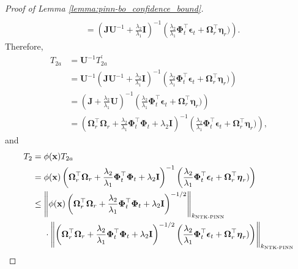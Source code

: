 \begin{proof}[Proof of Lemma \ref{lemma:pinn-bo_confidence_bound}]
\begin{align*}
\\
       & = \left(\mathbf{J}\mathbf{U}^{-1}  + \frac{\lambda_2}{\lambda_1}\mathbf{I} \right)^{-1} \left(\frac{\lambda_2}{\lambda_1}\boldsymbol{\Phi}_t^\top \boldsymbol{\epsilon}_t + \boldsymbol{\Omega}_r^\top \boldsymbol{\eta}_r) \right).
   \end{align*}
    Therefore, 
    \begin{align*}
            T_{2a} &= \mathbf{U}^{-1}  T_{2a}^\prime \\ 
            &= \mathbf{U}^{-1}\left(\mathbf{J}\mathbf{U}^{-1}  + \frac{\lambda_2}{\lambda_1}\mathbf{I} \right)^{-1} \left(\frac{\lambda_2}{\lambda_1}\boldsymbol{\Phi}_t^\top \boldsymbol{\epsilon}_t + \boldsymbol{\Omega}_r^\top \boldsymbol{\eta}_r) \right) \\
            & = \left(\mathbf{J} + \frac{\lambda_2}{\lambda_1}\mathbf{U} \right)^{-1} \left(\frac{\lambda_2}{\lambda_1}\boldsymbol{\Phi}_t^\top \boldsymbol{\epsilon}_t + \boldsymbol{\Omega}_r^\top \boldsymbol{\eta}_r) \right) \\
            & = \left(\boldsymbol{\Omega}_r^\top \boldsymbol{\Omega}_r + \frac{\lambda_2}{\lambda_1}\boldsymbol{\Phi}_t^\top\boldsymbol{\Phi}_t + \lambda_2\mathbf{I}\right)^{-1}\left(\frac{\lambda_2}{\lambda_1}\boldsymbol{\Phi}_t^\top \boldsymbol{\epsilon}_t + \boldsymbol{\Omega}_r^\top \boldsymbol{\eta}_r) \right),
    \end{align*}
    and 
    \begin{align*} 
            T_2 &= \phi(\mathbf{x}) T_{2a} 
            \\
                & = \phi(\mathbf{x})\left(\boldsymbol{\Omega}_r^\top \boldsymbol{\Omega}_r + \frac{\lambda_2}{\lambda_1}\boldsymbol{\Phi}_t^\top\boldsymbol{\Phi}_t + \lambda_2\mathbf{I}\right)^{-1}\left(\frac{\lambda_2}{\lambda_1}\boldsymbol{\Phi}_t^\top \boldsymbol{\epsilon}_t + \boldsymbol{\Omega}_r^\top \boldsymbol{\eta}_r) \right)
                \\
                & \le  \norm{\phi(\mathbf{x}) \left(\boldsymbol{\Omega}_r^\top \boldsymbol{\Omega}_r + \frac{\lambda_2}{\lambda_1}\boldsymbol{\Phi}_t^\top\boldsymbol{\Phi}_t + \lambda_2\mathbf{I}\right)^{-1/2}}_{k_\textup{NTK-PINN}} \notag \\
                & \;\;\;\;\; \cdot \norm{\left(\boldsymbol{\Omega}_r^\top \boldsymbol{\Omega}_r + \frac{\lambda_2}{\lambda_1}\boldsymbol{\Phi}_t^\top\boldsymbol{\Phi}_t + \lambda_2\mathbf{I}\right)^{-1/2}\left(\frac{\lambda_2}{\lambda_1}\boldsymbol{\Phi}_t^\top \boldsymbol{\epsilon}_t + \boldsymbol{\Omega}_r^\top \boldsymbol{\eta}_r) \right)}_{k_\textup{NTK-PINN}}

\end{align*}
\end{proof}
